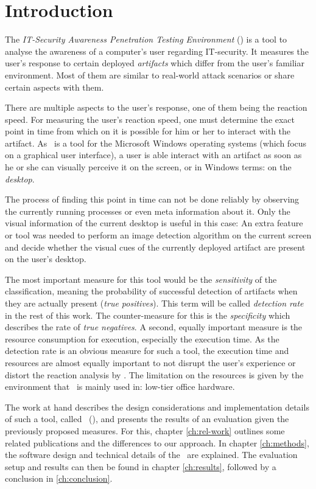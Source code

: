 \chapter{Introduction}\label{ch:intro}

The \emph{IT-Security Awareness Penetration Testing Environment} (\ape)\cite{itsape} is a tool to analyse the awareness of a computer's user regarding IT-security. It measures the user's response to certain deployed \emph{artifacts} which differ from the user's familiar environment. Most of them are similar to real-world attack scenarios or share certain aspects with them.

There are multiple aspects to the user's response, one of them being the reaction speed. For measuring the user's reaction speed, one must determine the exact point in time from which on it is possible for him or her to interact with the artifact. As \ape~is a tool for the Microsoft Windows operating systems (which focus on a graphical user interface), a user is able interact with an artifact as soon as he or she can visually perceive it on the screen, or in Windows terms: on the \emph{desktop}.

The process of finding this point in time can not be done reliably by observing the currently running processes or even meta information about it. Only the visual information of the current desktop is useful in this case: An extra feature or tool was needed to perform an image detection algorithm on the current screen and decide whether the visual cues of the currently deployed artifact are present on the user's desktop.

The most important measure for this tool would be the \emph{sensitivity} of the classification, meaning the probability of successful detection of artifacts when they are actually present (\emph{true positives}). This term will be called \emph{detection rate} in the rest of this work. The counter-measure for this is the \emph{specificity} which describes the rate of \emph{true negatives}. A second, equally important measure is the resource consumption for execution, especially the execution time. As the detection rate is an obvious measure for such a tool, the execution time and resources are almost equally important to not disrupt the user's experience or distort the reaction analysis by \ape. The limitation on the resources is given by the environment that \ape~is mainly used in: low-tier office hardware.

The work at hand describes the design considerations and implementation details of such a tool, called \vad~(\vd), and presents the results of an evaluation given the previously proposed measures. For this, chapter \ref{ch:rel-work} outlines some related publications and the differences to our approach. In chapter \ref{ch:methods}, the software design and technical details of the \vd~are explained. The evaluation setup and results can then be found in chapter \ref{ch:results}, followed by a conclusion in \ref{ch:conclusion}.

